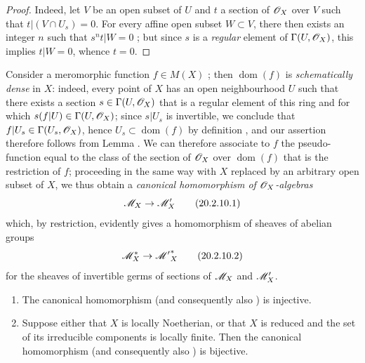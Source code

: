 \begin{proof}
Indeed, let $V$ be an open subset of $U$ and $t$ a section of $\mathscr{O}_X$ over $V$ such that $t|(V\cap U_s)=0$.
For every affine open subset $W\subset V$, there then exists an integer $n$ such that $s^nt|W=0$ ; but since $s$ is a \emph{regular} element of $\Gamma(U,\mathscr{O}_X)$, this implies $t|W=0$, whence $t=0$.
\end{proof}

\begin{env}[20.2.10]
\label{IV.20.2.10}
Consider a meromorphic function $f\in M(X)$ ; then $\operatorname{dom}(f)$ is \emph{schematically dense} in $X$: indeed, every point of $X$ has an open neighbourhood $U$ such that there exists a section $s\in\Gamma(U,\mathscr{O}_X)$ that is a regular element of this ring and for which $s(f|U)\in\Gamma(U,\mathscr{O}_X)$; since $s|U_s$ is invertible, we conclude that $f|U_s\in\Gamma(U_s,\mathscr{O}_X)$, hence $U_s\subset\operatorname{dom}(f)$ by definition , and our assertion therefore follows from Lemma .
We can therefore associate to $f$ the pseudo-function equal to the class of the section of $\mathscr{O}_X$ over $\operatorname{dom}(f)$ that is the restriction of $f$; proceeding in the same way with $X$ replaced by an arbitrary open subset of $X$, we thus obtain a \emph{canonical homomorphism of $\mathscr{O}_X$-algebras}
\[
\label{IV.20.2.10.1}
  \mathscr{M}_X\to\mathscr{M}'_X
  \tag{20.2.10.1}
\]
which, by restriction, evidently gives a homomorphism of sheaves of abelian groups
\[
\label{IV.20.2.10.2}
  \mathscr{M}_X^*\to{\mathscr{M}'}^*_X
  \tag{20.2.10.2}
\]
for the sheaves of invertible germs of sections of $\mathscr{M}_X$ and $\mathscr{M}'_X$.
\end{env}

\begin{proposition}[20.2.11]\label{IV.20.2.11}
\medskip
\begin{enumerate}[label=\emph{(\roman*)}]
  \item The canonical homomorphism \emph{} \textup{(and consequently also \emph{})} is injective.
  \item Suppose either that $X$ is locally Noetherian, or that $X$ is reduced and the set of its irreducible components is locally finite.
  Then the canonical homomorphism \emph{} \textup{(and consequently also \emph{})} is bijective.
\end{enumerate}
\end{proposition}

